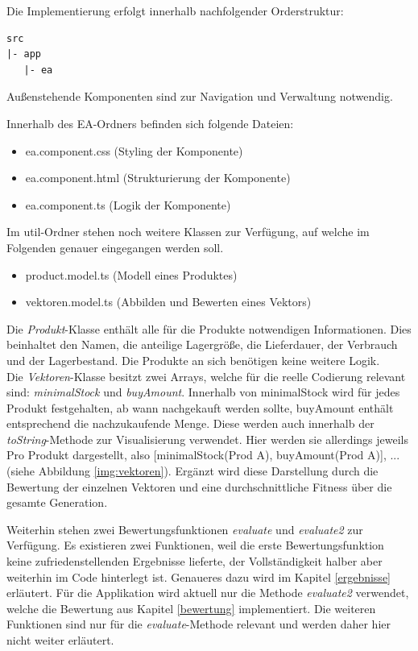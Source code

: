 \documentclass[]{scrartcl}
\begin{document}
Die Implementierung erfolgt innerhalb nachfolgender Orderstruktur:
\begin{lstlisting}[backgroundcolor=\color{lightgray}]
src
|- app
   |- ea
\end{lstlisting}
Außenstehende Komponenten sind zur Navigation und Verwaltung notwendig.

Innerhalb des EA-Ordners befinden sich folgende Dateien:
\begin{itemize}
\item ea.component.css (Styling der Komponente)
\item ea.component.html (Strukturierung der Komponente)
\item ea.component.ts (Logik der Komponente)
\end{itemize}

Im util-Ordner stehen noch weitere Klassen zur Verfügung, auf welche im Folgenden genauer eingegangen werden soll.
\begin{itemize}
	\item product.model.ts (Modell eines Produktes)
	\item vektoren.model.ts (Abbilden und Bewerten eines Vektors)
\end{itemize}

Die \textit{Produkt}-Klasse enthält alle für die Produkte notwendigen Informationen. Dies beinhaltet den Namen, die anteilige Lagergröße, die Lieferdauer, der Verbrauch und der Lagerbestand. Die Produkte an sich benötigen keine weitere Logik.\\

Die \textit{Vektoren}-Klasse besitzt zwei Arrays, welche für die reelle Codierung relevant sind: \textit{minimalStock} und \textit{buyAmount}. Innerhalb von minimalStock wird für jedes Produkt festgehalten, ab wann nachgekauft werden sollte, buyAmount enthält entsprechend die nachzukaufende Menge. Diese werden auch innerhalb der \textit{toString}-Methode zur Visualisierung verwendet. Hier werden sie allerdings jeweils Pro Produkt dargestellt, also [minimalStock(Prod A), buyAmount(Prod A)], ... (siehe Abbildung \ref{img:vektoren}). Ergänzt wird diese Darstellung durch die Bewertung der einzelnen Vektoren und eine durchschnittliche Fitness über die gesamte Generation.

Weiterhin stehen zwei Bewertungsfunktionen \textit{evaluate} und \textit{evaluate2} zur Verfügung. Es existieren zwei Funktionen, weil die erste Bewertungsfunktion keine zufriedenstellenden Ergebnisse lieferte, der Vollständigkeit halber aber weiterhin im Code hinterlegt ist. Genaueres dazu wird im Kapitel \ref{ergebnisse} erläutert. Für die Applikation wird aktuell nur die Methode \textit{evaluate2} verwendet, welche die Bewertung aus Kapitel \ref{bewertung} implementiert. Die weiteren Funktionen sind nur für die \textit{evaluate}-Methode relevant und werden daher hier nicht weiter erläutert.
\end{document}
